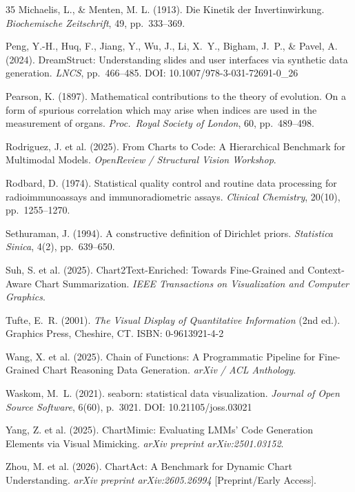 \documentclass[11pt,twocolumn]{article}
\begin{document}
\begin{thebibliography}{35}
Michaelis, L., \& Menten, M. L. (1913).
\newblock Die Kinetik der Invertinwirkung.
\newblock \emph{Biochemische Zeitschrift}, 49, pp.\ 333--369.

Peng, Y.-H., Huq, F., Jiang, Y., Wu, J., Li, X.~Y., Bigham, J.~P., \& Pavel, A. (2024).
\newblock DreamStruct: Understanding slides and user interfaces via synthetic data generation.
\newblock \emph{LNCS}, pp.\ 466--485.
\newblock DOI: 10.1007/978-3-031-72691-0\_26

Pearson, K. (1897).
\newblock Mathematical contributions to the theory of evolution. On a form of spurious correlation which may arise when indices are used in the measurement of organs.
\newblock \emph{Proc.\ Royal Society of London}, 60, pp.\ 489--498.

Rodriguez, J. et al. (2025).
\newblock From Charts to Code: A Hierarchical Benchmark for Multimodal Models.
\newblock \emph{OpenReview / Structural Vision Workshop}.

Rodbard, D. (1974).
\newblock Statistical quality control and routine data processing for radioimmunoassays and immunoradiometric assays.
\newblock \emph{Clinical Chemistry}, 20(10), pp.\ 1255--1270.

Sethuraman, J. (1994).
\newblock A constructive definition of Dirichlet priors.
\newblock \emph{Statistica Sinica}, 4(2), pp.\ 639--650.



Suh, S. et al. (2025).
\newblock Chart2Text-Enriched: Towards Fine-Grained and Context-Aware Chart Summarization.
\newblock \emph{IEEE Transactions on Visualization and Computer Graphics}.

Tufte, E.~R. (2001).
\newblock \emph{The Visual Display of Quantitative Information} (2nd ed.).
\newblock Graphics Press, Cheshire, CT.
\newblock ISBN: 0-9613921-4-2

Wang, X. et al. (2025).
\newblock Chain of Functions: A Programmatic Pipeline for Fine-Grained Chart Reasoning Data Generation.
\newblock \emph{arXiv / ACL Anthology}.

Waskom, M.~L. (2021).
\newblock seaborn: statistical data visualization.
\newblock \emph{Journal of Open Source Software}, 6(60), p.\ 3021.
\newblock DOI: 10.21105/joss.03021

Yang, Z. et al. (2025).
\newblock ChartMimic: Evaluating LMMs' Code Generation Elements via Visual Mimicking.
\newblock \emph{arXiv preprint arXiv:2501.03152}.

Zhou, M. et al. (2026).
\newblock ChartAct: A Benchmark for Dynamic Chart Understanding.
\newblock \emph{arXiv preprint arXiv:2605.26994} [Preprint/Early Access].

\end{thebibliography}
\end{document}
